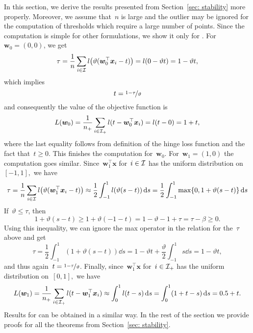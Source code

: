 In this section, we derive the results presented from Section~\ref{sec: stability} more properly. 
\degeneratebehavior*
\noindent Moreover, we assume that~$n$ is large and the outlier may be ignored for the computation of thresholds which require a large number of points. Since the computation is simple for other formulations, we show it only for \PatMat. For~$\bm{w}_0 = (0,0)$, we get
\begin{equation*}
  \tau
  = \frac{1}{n}\sum_{i \in \I} l\Brac{\vartheta(\bm{w}_0^\top \bm{x}_i - t)}
  = l(0 - \vartheta t) = 1 - \vartheta t,
\end{equation*}
which implies
\begin{equation*}\label{eq: PatMat threshold 0}
  t = \nicefrac{1-\tau}{\vartheta}
\end{equation*}
and consequently the value of the objective function is
\begin{equation}\label{eq: PatMat objective 0}
  L(\bm{w}_0)
    = \frac{1}{n_{+}} \sum_{i \in \mathcal{I}_{+}} l(t - \bm{w}_0^\top \bm{x}_i)
    = l(t - 0)
    = 1 + t,
\end{equation}
where the last equality follows from definition of the hinge loss function and the fact that~$t \ge 0.$ This finishes the computation for~$\bm{w}_0$. For~$\bm{w}_1 = (1,0)$ the computation goes similar. Since~$\bm{w}_1^\top \bm{x}$  for~$i \in \mathcal{I}$ has the uniform distribution on~$[-1,1],$ we have
\begin{equation*}
  \tau
    = \frac{1}{n} \sum_{i \in \I} l\Brac{\vartheta (\bm{w}_1^\top \bm{x}_i - t)}
    \approx \frac{1}{2}\int_{-1}^{1} l\Brac{\vartheta(s-t)} \dd{s}
    = \frac{1}{2} \int_{-1}^{1} \max\{0, 1 + \vartheta(s - t)\}\dd{s}
\end{equation*}
If~$\vartheta \le \tau$, then
\begin{equation*}
  1 + \vartheta(s - t)
    \ge 1 + \vartheta(-1 - t)
    = 1 - \vartheta - 1 + \tau
    = \tau - \beta
    \ge 0.
\end{equation*}
Using this inequality, we can ignore the max operator in the relation for the~$\tau$ above and get
\begin{equation}\label{eq:example1}
  \tau
    =\frac{1}{2} \int_{-1}^{1} (1+\vartheta(s - t))\dd{s}
    = 1 - \vartheta t + \frac{\vartheta}{2}\int_{-1}^{1}s\dd{s}
    = 1 - \vartheta t,
\end{equation}
and thus again~$t = \nicefrac{1-\tau}{\vartheta}$. Finally, since~$\bm{w}_1^\top \bm{x}$  for~$i \in \mathcal{I}_{+}$ has the uniform distribution on~$[0,1],$ we have
\begin{equation*}
  L(\bm{w}_1)
    = \frac{1}{n_{+}} \sum_{i \in \mathcal{I}_{+}} l(t - \bm{w}_1^\top \bm{x}_i)
    \approx \int_{0}^{1} l(t-s)\mathop{}\!\mathrm{d}s
    = \int_{0}^{1} (1 + t - s)\mathop{}\!\mathrm{d}s
    = 0.5 + t.
\end{equation*}
Results for \PatMatNP can be obtained in a similar way. In the rest of the section we provide proofs for all the theorems from Section~\ref{sec: stability}.

